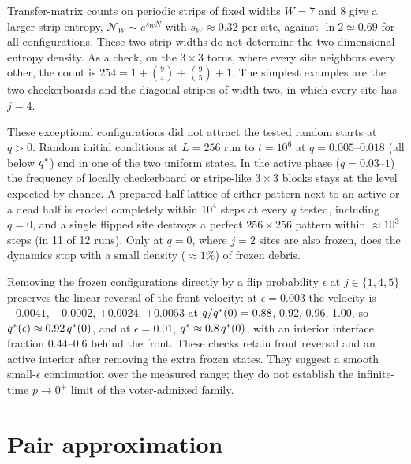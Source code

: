 Transfer-matrix counts on periodic strips of fixed widths $W=7$ and $8$
give a larger strip entropy, $\mathcal N_W\sim e^{s_WN}$ with
$s_W\approx0.32$ per site, against $\ln2\simeq0.69$ for all configurations.
These two strip widths do not determine the two-dimensional entropy density.
As a check,
on the $3\times3$ torus, where every site neighbors every other, the count is
$254 = 1 + \binom94 + \binom95 + 1$. The simplest examples are the two checkerboards and the
diagonal stripes of width two, in which every site has $j = 4$.

These exceptional configurations did not attract the tested random starts at $q>0$. Random initial conditions at $L = 256$
run to $t = 10^6$ at $q = 0.005$--$0.018$ (all below $q^{*}$) end in one of the two uniform states.
In the active phase ($q = 0.03$--$1$) the frequency of locally checkerboard or stripe-like
$3\times3$ blocks stays at the level expected by chance. A prepared half-lattice of either pattern
next to an active or a dead half is eroded completely within $10^4$ steps at every $q$ tested,
including $q = 0$, and a single flipped site destroys a perfect $256\times256$ pattern within
$\approx 10^3$ steps (in 11 of 12 runs). Only at $q = 0$, where $j = 2$ sites are also frozen, does
the dynamics stop with a small density ($\approx 1\%$) of frozen debris.

Removing the frozen configurations directly by a flip probability $\epsilon$ at
$j\in\{1,4,5\}$ preserves the linear reversal of the front velocity: at $\epsilon = 0.003$ the
velocity is $-0.0041$, $-0.0002$, $+0.0024$, $+0.0053$ at $q/q^{*}(0) = 0.88$, 0.92, 0.96, 1.00, so
$q^{*}(\epsilon)\approx 0.92\,q^{*}(0)$, and at $\epsilon = 0.01$, $q^{*}\approx 0.8\,q^{*}(0)$, with
an interior interface fraction 0.44--0.6 behind the front. These checks retain
front reversal and an active interior after removing the extra frozen states.
They suggest a smooth small-$\epsilon$ continuation over the measured range;
they do not establish the infinite-time $p\to0^+$ limit of the voter-admixed family.

\section{Pair approximation}
\label{app:pa}

